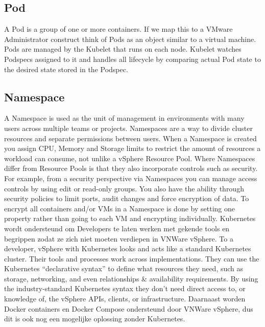 \subsection{Pod}
A Pod is a group of one or more containers. If we map this to a VMware Administrator construct think of Pods as an object similar to a virtual machine. Pods are managed by the Kubelet that runs on each node. Kubelet watches Podspecs assigned to it and handles all lifecycle by comparing actual Pod state to the desired state stored in the Podspec.\autocite{VMware2019}

\subsection{Namespace}
A Namespace is used as the unit of management in environments with many users across multiple teams or projects. Namespaces are a way to divide cluster resources and separate permissions between users. When a Namespace is created you assign CPU, Memory and Storage limits to restrict the amount of resources a workload can consume, not unlike a vSphere Resource Pool. Where Namespaces differ from Resource Pools is that they also incorporate controls such as security. For example, from a security perspective via Namespaces you can manage access controls by using edit or read-only groups. You also have the ability through security policies to limit ports, audit changes and force encryption of data. To encrypt all containers and/or VMs in a Namespace is done by setting one property rather than going to each VM and encrypting individually.\autocite{VMware2019}
\newline
\newline
Kubernetes wordt ondersteund om Developers te laten werken met gekende tools en begrippen zodat ze zich niet moeten verdiepen in VNWare vSphere.
\newline
\newline
To a developer, vSphere with Kubernetes looks and acts like a standard Kubernetes cluster. Their tools and processes work across implementations. They can use the Kubernetes “declarative syntax” to define what resources they need, such as storage, networking, and even relationships \& availability requirements. By using the industry-standard Kubernetes syntax they don’t need direct access to, or knowledge of, the vSphere APIs, clients, or infrastructure.\autocite{VMware2019}
\newline
\newline
Daarnaast worden Docker containers en Docker Compose ondersteund door VNWare vSphere, dus dit is ook nog een mogelijke oplossing zonder Kubernetes. 

